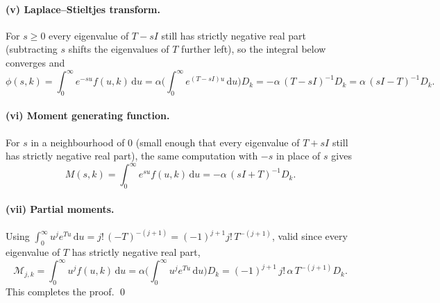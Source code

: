 \documentclass{article}
\begin{document}
\paragraph{(v) Laplace--Stieltjes transform.}
For $s\ge0$ every eigenvalue of $T-sI$ still has strictly negative real part (subtracting $s$ shifts the eigenvalues of $T$ further left), so the integral below converges and
\[
\phi(s,k)=\int_0^\infty e^{-su} f(u,k)\,\mathrm{d}u
=\alpha\Big(\int_0^\infty e^{(T-sI)u}\,\mathrm{d}u\Big)D_k
=-\alpha\,(T-sI)^{-1}D_k
=\alpha\,(sI-T)^{-1}D_k.
\]

\paragraph{(vi) Moment generating function.}
For $s$ in a neighbourhood of $0$ (small enough that every eigenvalue of $T+sI$ still has strictly negative real part), the same computation with $-s$ in place of $s$ gives
\[
M(s,k)=\int_0^\infty e^{su} f(u,k)\,\mathrm{d}u
=-\alpha\,(sI+T)^{-1}D_k.
\]

\paragraph{(vii) Partial moments.}
Using $\int_0^\infty u^j e^{Tu}\,\mathrm{d}u = j!\,(-T)^{-(j+1)}=(-1)^{j+1}j!\,T^{-(j+1)}$, valid since every eigenvalue of $T$ has strictly negative real part,
\[
\mathcal{M}_{j,k}=\int_0^\infty u^j f(u,k)\,\mathrm{d}u
=\alpha\Big(\int_0^\infty u^j e^{Tu}\,\mathrm{d}u\Big)D_k
=(-1)^{j+1}\,j!\,\alpha\,T^{-(j+1)}D_k.
\]
This completes the proof. \qed
\end{document}
